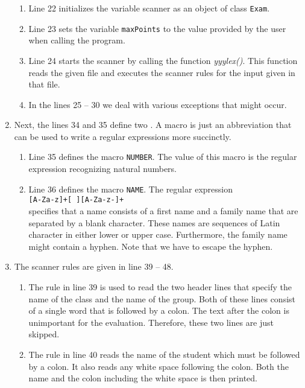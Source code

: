 \begin{enumerate}
\begin{enumerate}
      \item Line 22 initializes the variable scanner as an object of class \texttt{Exam}.
      \item Line 23 sets the variable \texttt{maxPoints} to the value provided by the user when
            calling the program.
      \item Line 24 starts the scanner by calling the function \textsl{yyylex()}.  This function
            reads the given file and executes the scanner rules for the input given in that file.
      \item In the lines 25 -- 30 we deal with various exceptions that might occur.   
      \end{enumerate}
\item Next, the lines 34 and 35 define two .  A macro is just an abbreviation that can
      be used to write a regular expressions more succinctly.
      \begin{enumerate}
      \item Line 35 defines the macro  \texttt{NUMBER}.  The value of this macro is the regular
            expression recognizing natural numbers.
      \item Line 36 defines the macro \texttt{NAME}.  The regular expression
            \\[0.2cm]
            \hspace*{1.3cm}
            \texttt{[A-Za-z]+[ ][A-Za-z-]+}
            \\[0.2cm]
            specifies that a name consists of a first name and a family name that are separated by a
            blank character.  These names are sequences of Latin character in either lower or upper
            case.  Furthermore, the family name might contain a hyphen.  Note that we have to escape
            the hyphen.
      \end{enumerate}
\item The scanner rules are given in line 39 -- 48.
      \begin{enumerate}
      \item The rule in line 39 is used to read the two header lines that specify the name of the
            class and the name of the group.
            Both of these lines consist of a single word that is followed by a colon.  The text
            after the colon is unimportant for the evaluation.  Therefore, these two lines are just skipped.
      \item The rule in line 40 reads the name of the student which must be followed by a colon.
            It also reads any white space following the colon.  Both the name and the colon
            including the white space is then printed.


\end{enumerate}
\end{enumerate}
